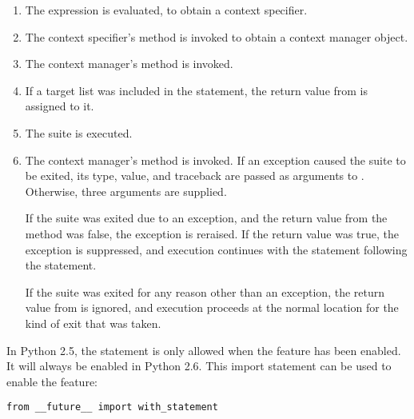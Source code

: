 \begin{enumerate}

\item The expression is evaluated, to obtain a context specifier.

\item The context specifier's  method is
invoked to obtain a context manager object.

\item The context manager's  method is invoked.

\item If a target list was included in the 
statement, the return value from  is assigned to it.


\item The suite is executed.

\item The context manager's  method is invoked. If
an exception caused the suite to be exited, its type, value, and
traceback are passed as arguments to . Otherwise,
three  arguments are supplied.

If the suite was exited due to an exception, and the return
value from the  method was false, the exception is
reraised. If the return value was true, the exception is suppressed, and
execution continues with the statement following the 
statement.

If the suite was exited for any reason other than an exception, the
return value from  is ignored, and execution proceeds
at the normal location for the kind of exit that was taken.

\end{enumerate}

\begin{notice}
In Python 2.5, the  statement is only allowed
when the  feature has been enabled.  It will always
be enabled in Python 2.6.  This  import statement can
be used to enable the feature:

\begin{verbatim}
from __future__ import with_statement
\end{verbatim}
\end{notice}

